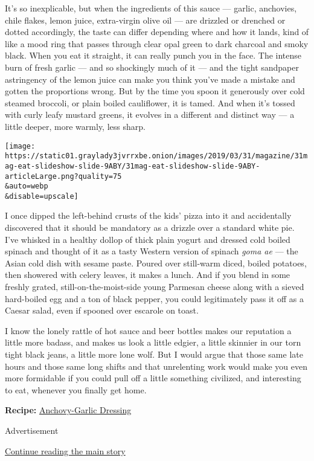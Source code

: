 It's so inexplicable, but when the ingredients of this sauce --- garlic,
anchovies, chile flakes, lemon juice, extra-virgin olive oil --- are
drizzled or drenched or dotted accordingly, the taste can differ
depending where and how it lands, kind of like a mood ring that passes
through clear opal green to dark charcoal and smoky black. When you eat
it straight, it can really punch you in the face. The intense burn of
fresh garlic --- and so shockingly much of it --- and the tight
sandpaper astringency of the lemon juice can make you think you've made
a mistake and gotten the proportions wrong. But by the time you spoon it
generously over cold steamed broccoli, or plain boiled cauliflower, it
is tamed. And when it's tossed with curly leafy mustard greens, it
evolves in a different and distinct way --- a little deeper, more
warmly, less sharp.

\texttt{[image: https://static01.graylady3jvrrxbe.onion/images/2019/03/31/magazine/31mag-eat-slideshow-slide-9ABY/31mag-eat-slideshow-slide-9ABY-articleLarge.png?quality=75\\\&auto=webp\\\&disable=upscale]}

I once dipped the left-behind crusts of the kids' pizza into it and
accidentally discovered that it should be mandatory as a drizzle over a
standard white pie. I've whisked in a healthy dollop of thick plain
yogurt and dressed cold boiled spinach and thought of it as a tasty
Western version of spinach \emph{goma ae} --- the Asian cold dish with
sesame paste. Poured over still-warm diced, boiled potatoes, then
showered with celery leaves, it makes a lunch. And if you blend in some
freshly grated, still-on-the-moist-side young Parmesan cheese along with
a sieved hard-boiled egg and a ton of black pepper, you could
legitimately pass it off as a Caesar salad, even if spooned over
escarole on toast.

I know the lonely rattle of hot sauce and beer bottles makes our
reputation a little more badass, and makes us look a little edgier, a
little skinnier in our torn tight black jeans, a little more lone wolf.
But I would argue that those same late hours and those same long shifts
and that unrelenting work would make you even more formidable if you
could pull off a little something civilized, and interesting to eat,
whenever you finally get home.

\textbf{Recipe:}
\href{https://cooking.nytimes3xbfgragh.onion/recipes/1020127-anchovy-garlic-dressing}{Anchovy-Garlic
Dressing}

Advertisement

\protect\hyperlink{after-bottom}{Continue reading the main story}

